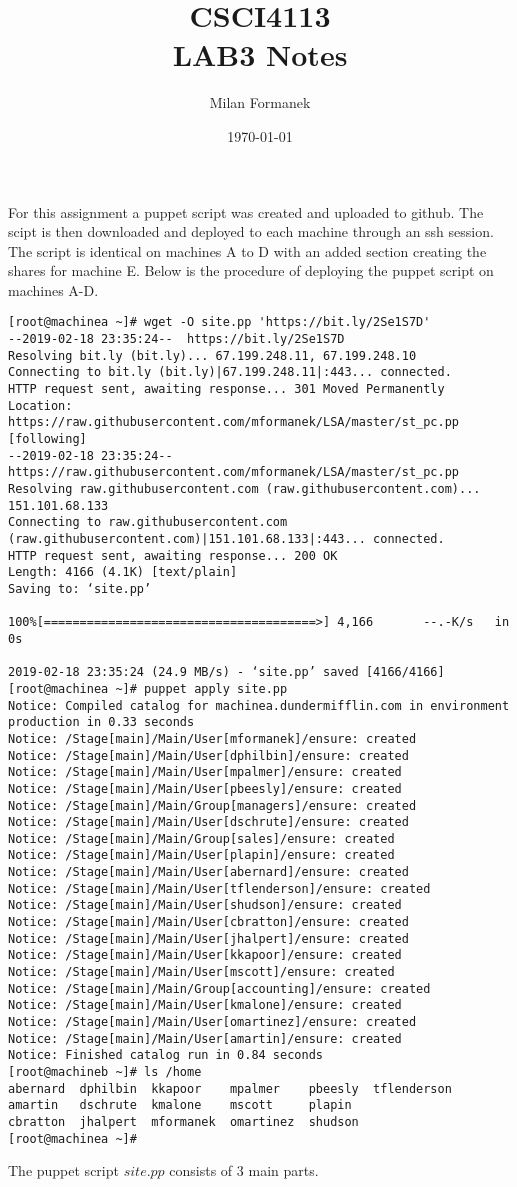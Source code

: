 \documentclass[11pt,onside]{article}
\title{\blue CSCI4113 \\
\blueb LAB3 Notes}
\author{Milan Formanek}
\date{\today} %
\begin{document}
\maketitle

\section{}
For this assignment a puppet script was created and uploaded to github. The scipt is then downloaded and deployed to each machine through an ssh session. The script is identical on machines A to D with an added section creating the shares for machine E.
Below is the procedure of deploying the puppet script on machines A-D. 
\begin{lstlisting}
[root@machinea ~]# wget -O site.pp 'https://bit.ly/2Se1S7D'
--2019-02-18 23:35:24--  https://bit.ly/2Se1S7D
Resolving bit.ly (bit.ly)... 67.199.248.11, 67.199.248.10
Connecting to bit.ly (bit.ly)|67.199.248.11|:443... connected.
HTTP request sent, awaiting response... 301 Moved Permanently
Location: https://raw.githubusercontent.com/mformanek/LSA/master/st_pc.pp [following]
--2019-02-18 23:35:24--  https://raw.githubusercontent.com/mformanek/LSA/master/st_pc.pp
Resolving raw.githubusercontent.com (raw.githubusercontent.com)... 151.101.68.133
Connecting to raw.githubusercontent.com (raw.githubusercontent.com)|151.101.68.133|:443... connected.
HTTP request sent, awaiting response... 200 OK
Length: 4166 (4.1K) [text/plain]
Saving to: ‘site.pp’

100%[======================================>] 4,166       --.-K/s   in 0s

2019-02-18 23:35:24 (24.9 MB/s) - ‘site.pp’ saved [4166/4166]
[root@machinea ~]# puppet apply site.pp
Notice: Compiled catalog for machinea.dundermifflin.com in environment production in 0.33 seconds
Notice: /Stage[main]/Main/User[mformanek]/ensure: created
Notice: /Stage[main]/Main/User[dphilbin]/ensure: created
Notice: /Stage[main]/Main/User[mpalmer]/ensure: created
Notice: /Stage[main]/Main/User[pbeesly]/ensure: created
Notice: /Stage[main]/Main/Group[managers]/ensure: created
Notice: /Stage[main]/Main/User[dschrute]/ensure: created
Notice: /Stage[main]/Main/Group[sales]/ensure: created
Notice: /Stage[main]/Main/User[plapin]/ensure: created
Notice: /Stage[main]/Main/User[abernard]/ensure: created
Notice: /Stage[main]/Main/User[tflenderson]/ensure: created
Notice: /Stage[main]/Main/User[shudson]/ensure: created
Notice: /Stage[main]/Main/User[cbratton]/ensure: created
Notice: /Stage[main]/Main/User[jhalpert]/ensure: created
Notice: /Stage[main]/Main/User[kkapoor]/ensure: created
Notice: /Stage[main]/Main/User[mscott]/ensure: created
Notice: /Stage[main]/Main/Group[accounting]/ensure: created
Notice: /Stage[main]/Main/User[kmalone]/ensure: created
Notice: /Stage[main]/Main/User[omartinez]/ensure: created
Notice: /Stage[main]/Main/User[amartin]/ensure: created
Notice: Finished catalog run in 0.84 seconds
[root@machineb ~]# ls /home
abernard  dphilbin  kkapoor    mpalmer    pbeesly  tflenderson
amartin   dschrute  kmalone    mscott     plapin
cbratton  jhalpert  mformanek  omartinez  shudson
[root@machinea ~]#
\end{lstlisting}
The puppet script $site.pp$ consists of 3 main parts.
\end{document}
